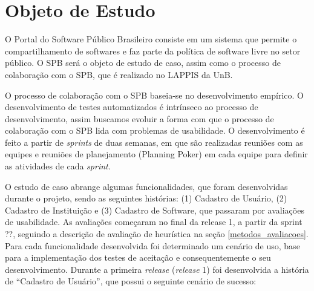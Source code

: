 \section{Objeto de Estudo}

O Portal do Software Público Brasileiro consiste em um sistema que permite o compartilhamento de softwares e faz parte da política de software livre no setor público.
O SPB será o objeto de estudo de caso, assim como o processo de colaboração com o SPB, que é realizado no LAPPIS da UnB.

O processo de colaboração com o SPB baseia-se no desenvolvimento empírico. O desenvolvimento de testes automatizados é intrínseco ao processo de desenvolvimento, assim buscamos evoluir a forma com que o processo de colaboração com o SPB lida com problemas de usabilidade.
O desenvolvimento é feito a partir de \textit{sprints} de duas semanas, em que são realizadas reuniões com as equipes e reuniões de planejamento (Planning Poker) em cada equipe para definir as atividades de cada \textit{sprint}.

O estudo de caso abrange algumas funcionalidades, que foram desenvolvidas durante o projeto, sendo as seguintes histórias: (1) Cadastro de Usuário, (2) Cadastro de Instituição e (3) Cadastro de Software, que passaram por avaliações de usabilidade. As avaliações começaram no final da release 1, a partir da sprint ??, seguindo a descrição de avaliação de heurística na seção \ref{metodos_avaliacoes}.
%
Para cada funcionalidade desenvolvida foi determinado um cenário de uso, base para a implementação dos testes de aceitação e consequentemente o seu desenvolvimento.
%
Durante a primeira \textit{release} (\textit{release} 1) foi desenvolvida a história de ``Cadastro de Usuário'', que possui o seguinte cenário de sucesso:

